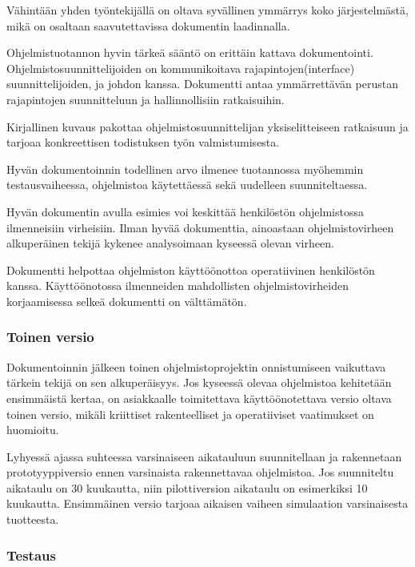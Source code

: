 \documentclass[finnish]{tktltiki2}
\theoremstyle{definition}
\theoremstyle{remark}
\begin{document}
Vähintään yhden työntekijällä on oltava syvällinen ymmärrys koko järjestelmästä, mikä on osaltaan saavutettavissa dokumentin laadinnalla.\cite{ROY70}

Ohjelmistuotannon hyvin tärkeä sääntö on erittäin kattava dokumentointi. Ohjelmistosuunnittelijoiden on kommunikoitava rajapintojen(interface) suunnittelijoiden, ja johdon kanssa. Dokumentti antaa ymmärrettävän perustan rajapintojen suunnitteluun ja hallinnollisiin ratkaisuihin.\cite{ROY70}

Kirjallinen kuvaus pakottaa ohjelmistosuunnittelijan yksiselitteiseen ratkaisuun ja tarjoaa konkreettisen todistuksen työn valmistumisesta.\cite{ROY70}

Hyvän dokumentoinnin todellinen arvo ilmenee tuotannossa myöhemmin testausvaiheessa, ohjelmistoa käytettäessä sekä uudelleen suunniteltaessa.\cite{ROY70}

Hyvän dokumentin avulla esimies voi keskittää henkilöstön ohjelmistossa ilmenneisiin virheisiin. Ilman hyvää dokumenttia, ainoastaan ohjelmistovirheen alkuperäinen tekijä kykenee analysoimaan kyseessä olevan virheen.\cite{ROY70}

Dokumentti helpottaa ohjelmiston käyttöönottoa operatiivinen henkilöstön kanssa. Käyttöönotossa ilmenneiden mahdollisten ohjelmistovirheiden korjaamisessa selkeä dokumentti on välttämätön.\cite{ROY70}   

\subsubsection{Toinen versio}

Dokumentoinnin jälkeen toinen ohjelmistoprojektin onnistumiseen vaikuttava tärkein tekijä on sen alkuperäisyys. Jos kyseessä olevaa ohjelmistoa kehitetään ensimmäistä kertaa, on asiakkaalle toimitettava käyttöönotettava versio oltava toinen versio, mikäli kriittiset rakenteelliset ja operatiiviset vaatimukset on huomioitu.\cite{ROY70} 

Lyhyessä ajassa suhteessa varsinaiseen aikatauluun suunnitellaan ja rakennetaan prototyyppiversio ennen varsinaista rakennettavaa ohjelmistoa. Jos suunniteltu aikataulu on 30 kuukautta, niin pilottiversion aikataulu on esimerkiksi 10 kuukautta. Ensimmäinen versio tarjoaa aikaisen vaiheen simulaation varsinaisesta tuotteesta.\cite{ROY70}

\subsubsection{Testaus}
\end{document}
